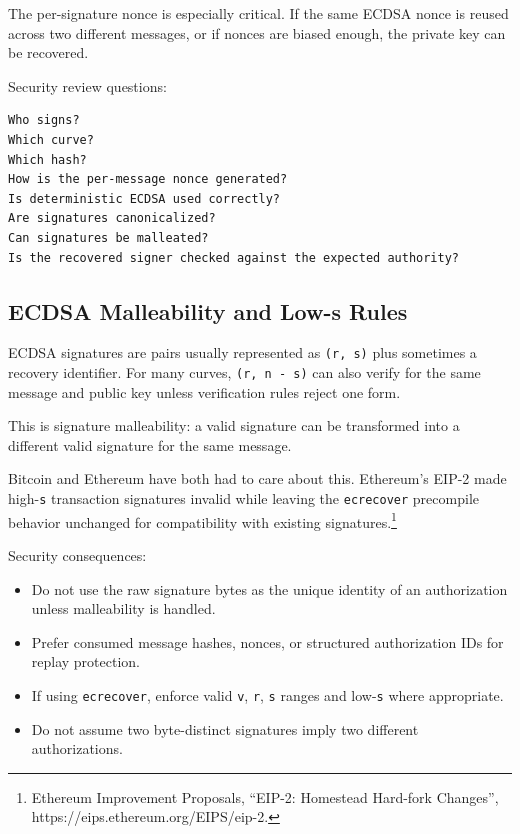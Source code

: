 The per-signature nonce is especially critical. If the same ECDSA nonce
is reused across two different messages, or if nonces are biased enough,
the private key can be recovered.

Security review questions:

\begin{lstlisting}
Who signs?
Which curve?
Which hash?
How is the per-message nonce generated?
Is deterministic ECDSA used correctly?
Are signatures canonicalized?
Can signatures be malleated?
Is the recovered signer checked against the expected authority?
\end{lstlisting}

\subsection{ECDSA Malleability and Low-s Rules}

ECDSA signatures are pairs usually represented as
\passthrough{\lstinline!(r, s)!} plus sometimes a recovery identifier.
For many curves, \passthrough{\lstinline!(r, n - s)!} can also verify
for the same message and public key unless verification rules reject one
form.

This is signature malleability: a valid signature can be transformed
into a different valid signature for the same message.

Bitcoin and Ethereum have both had to care about this. Ethereum's EIP-2
made high-\passthrough{\lstinline!s!} transaction signatures invalid
while leaving the \passthrough{\lstinline!ecrecover!} precompile
behavior unchanged for compatibility with existing
signatures.\footnote{Ethereum Improvement Proposals, ``EIP-2: Homestead
  Hard-fork Changes'', https://eips.ethereum.org/EIPS/eip-2.}

Security consequences:

\begin{itemize}
\tightlist
\item
  Do not use the raw signature bytes as the unique identity of an
  authorization unless malleability is handled.
\item
  Prefer consumed message hashes, nonces, or structured authorization
  IDs for replay protection.
\item
  If using \passthrough{\lstinline!ecrecover!}, enforce valid
  \passthrough{\lstinline!v!}, \passthrough{\lstinline!r!},
  \passthrough{\lstinline!s!} ranges and low-\passthrough{\lstinline!s!}
  where appropriate.
\item
  Do not assume two byte-distinct signatures imply two different
  authorizations.
\end{itemize}

